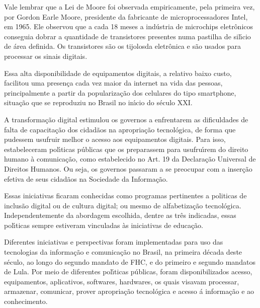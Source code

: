 \documentclass[
12pt,		%
openright,	%
twoside,  %
a4paper,			%
chapter=TITLE,		%
english,			%
french,				%
spanish,			%
brazil				%
]{USPSC-classe/USPSC}
\begin{document}
Vale lembrar que a Lei de Moore foi observada empiricamente, pela primeira vez, por Gordon Earle Moore, presidente da fabricante de microprocessadores Intel, em 1965. Ele observou que a cada 18 meses a ind\'ustria de microchips eletr\^onicos conseguia dobrar a quantidade de transistores presentes numa pastilha de sil\'{\i}cio de \'area definida. Os transistores s\~ao os \textquotedbl tijolos\textquotedbl  da eletr\^onica e s\~ao usados para processar os sinais digitais.








Essa alta disponibilidade de equipamentos digitais, a relativo baixo custo, facilitou uma presen\c{c}a cada vez maior da internet na vida das pessoas, principalmente a partir da populariza\c{c}\~ao dos celulares do tipo \textquotedbl smartphone\textquotedbl , situa\c{c}\~ao que se reproduziu no Brasil no in\'{\i}cio do s\'eculo XXI.








A transforma\c{c}\~ao digital estimulou os governos a enfrentarem as dificuldades  de falta de  capacita\c{c}\~ao dos cidad\~aos na apropria\c{c}\~ao tecnol\'ogica, de forma que pudessem usufruir melhor o acesso aos equipamentos digitais. Para isso, estabeleceram pol\'{\i}ticas p\'ublicas que os preparassem para usufru\'{\i}rem do direito humano \`a comunica\c{c}\~ao, como estabelecido no Art. 19 da Declara\c{c}\~ao Universal de Direitos Humanos. Ou seja, os governos passaram a se preocupar com a inser\c{c}\~ao efetiva de seus cidad\~aos na Sociedade da Informa\c{c}\~ao.








Essas iniciativas ficaram conhecidas como programas pertinentes a politicas de \textquotedbl inclus\~ao digital ou  de \textquotedbl cultura digital\textquotedbl ; ou mesmo de \textquotedbl alfabetiza\c{c}\~ao tecnol\'ogica\textquotedbl . Independentemente da abordagem escolhida, dentre as tr\^es indicadas, essas pol\'{\i}ticas sempre estiveram vinculadas \`as iniciativas de educa\c{c}\~ao.








Diferentes iniciativas e perspectivas foram implementadas para uso das tecnologias da informa\c{c}\~ao e comunica\c{c}\~ao no Brasil, na primeira d\'ecada deste s\'eculo, ao longo do segundo mandato de FHC, e do primeiro e segundo mandatos de Lula. Por meio de diferentes pol\'{\i}ticas p\'ublicas, foram disponibilizados acesso, equipamentos, aplicativos, softwares, hardwares, os quais visavam processar, armazenar, comunicar, prover apropria\c{c}\~ao tecnol\'ogica e acesso \'a informa\c{c}\~ao e ao conhecimento.
\end{document}
